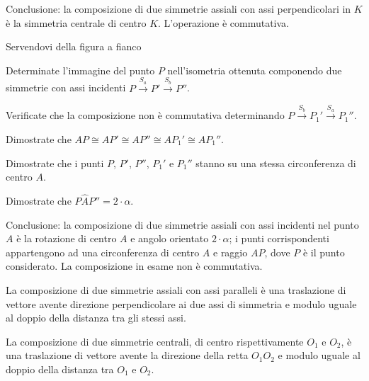 Conclusione: la composizione di due simmetrie assiali con assi perpendicolari in $K$ è la simmetria centrale di centro $K$. L'operazione è commutativa.
\pagebreak
\begin{exrig}
\noindent\begin{minipage}{0.6\textwidth}\parindent15pt
\begin{esempio}
Servendovi della figura a fianco
\begin{itemize*}
\item Determinate l'immagine del punto $P$ nell'isometria ottenuta componendo due simmetrie con assi incidenti $P\overset{S_a}\rightarrow P' \overset{S_b}\rightarrow P''$.
\item Verificate che la composizione non è commutativa determinando $P\overset{S_b}\rightarrow P_1' \overset{S_a}\rightarrow P_1''$.
\item Dimostrate che $AP \cong AP'\cong AP''\cong AP_1' \cong AP_1''$.
\item Dimostrate che i punti $P$, $P'$, $P''$, $P_1'$ e $P_1''$ stanno su una stessa circonferenza di centro $A$.
\item Dimostrate che $P\widehat{A}P''=2\cdot \alpha$.
\end{itemize*}
\end{esempio}
\end{minipage}\hfil
\begin{minipage}{0.4\textwidth}
	\centering
\end{minipage}\vspace{5pt}
\end{exrig}
			
Conclusione: la composizione di due simmetrie assiali con assi incidenti nel punto $A$ è la rotazione di centro $A$ e angolo orientato $2\cdot \alpha$; i punti corrispondenti appartengono ad una circonferenza di centro $A$ e raggio $AP$, dove $P$ è il punto considerato. La composizione in esame non è commutativa.
			
\begin{proposizione}
La composizione di due simmetrie assiali con assi paralleli è una traslazione di vettore avente direzione perpendicolare ai due assi di simmetria e modulo uguale al doppio della distanza tra gli stessi assi.
\end{proposizione}
			
\begin{proposizione}
La composizione di due simmetrie centrali, di centro rispettivamente $O_1$ e $O_2$, è una traslazione di vettore avente la direzione della retta $O_1O_2$ e modulo uguale al doppio della distanza tra $O_1$ e $O_2$.
\end{proposizione}
			
